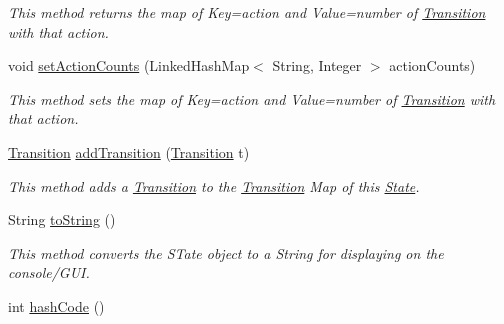 \begin{DoxyCompactItemize}
\begin{DoxyCompactList}\small\item\em This method returns the map of Key=action and Value=number of \hyperlink{classese_1_1seas_1_1upenn_1_1edu_1_1_transition}{Transition} with that action. \end{DoxyCompactList}\item 
\hypertarget{classese_1_1seas_1_1upenn_1_1edu_1_1_state_a6619cae7d9f2e5ce815f88d819d3eb84}{}void \hyperlink{classese_1_1seas_1_1upenn_1_1edu_1_1_state_a6619cae7d9f2e5ce815f88d819d3eb84}{set\+Action\+Counts} (Linked\+Hash\+Map$<$ String, Integer $>$ action\+Counts)\label{classese_1_1seas_1_1upenn_1_1edu_1_1_state_a6619cae7d9f2e5ce815f88d819d3eb84}

\begin{DoxyCompactList}\small\item\em This method sets the map of Key=action and Value=number of \hyperlink{classese_1_1seas_1_1upenn_1_1edu_1_1_transition}{Transition} with that action. \end{DoxyCompactList}\item 
\hypertarget{classese_1_1seas_1_1upenn_1_1edu_1_1_state_a01295ee4b9e3b27146805b44349c482b}{}\hyperlink{classese_1_1seas_1_1upenn_1_1edu_1_1_transition}{Transition} \hyperlink{classese_1_1seas_1_1upenn_1_1edu_1_1_state_a01295ee4b9e3b27146805b44349c482b}{add\+Transition} (\hyperlink{classese_1_1seas_1_1upenn_1_1edu_1_1_transition}{Transition} t)\label{classese_1_1seas_1_1upenn_1_1edu_1_1_state_a01295ee4b9e3b27146805b44349c482b}

\begin{DoxyCompactList}\small\item\em This method adds a \hyperlink{classese_1_1seas_1_1upenn_1_1edu_1_1_transition}{Transition} to the \hyperlink{classese_1_1seas_1_1upenn_1_1edu_1_1_transition}{Transition} Map of this \hyperlink{classese_1_1seas_1_1upenn_1_1edu_1_1_state}{State}. \end{DoxyCompactList}\item 
\hypertarget{classese_1_1seas_1_1upenn_1_1edu_1_1_state_a1724aba4281e960ec3be7d2d6848e5c0}{}String \hyperlink{classese_1_1seas_1_1upenn_1_1edu_1_1_state_a1724aba4281e960ec3be7d2d6848e5c0}{to\+String} ()\label{classese_1_1seas_1_1upenn_1_1edu_1_1_state_a1724aba4281e960ec3be7d2d6848e5c0}

\begin{DoxyCompactList}\small\item\em This method converts the S\+Tate object to a String for displaying on the console/\+G\+U\+I. \end{DoxyCompactList}\item 
\hypertarget{classese_1_1seas_1_1upenn_1_1edu_1_1_state_acf160eec0ee396407b972335c26196e3}{}int \hyperlink{classese_1_1seas_1_1upenn_1_1edu_1_1_state_acf160eec0ee396407b972335c26196e3}{hash\+Code} ()\label{classese_1_1seas_1_1upenn_1_1edu_1_1_state_acf160eec0ee396407b972335c26196e3}


\end{DoxyCompactItemize}
